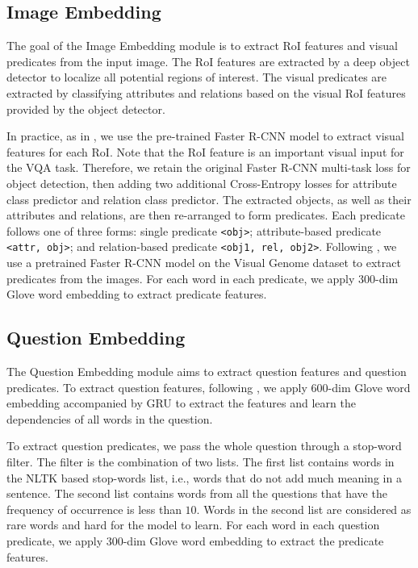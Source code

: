 \documentclass[10pt,twocolumn,letterpaper]{article}
\begin{document}
\subsection{Image Embedding}
\label{subsec_image_embedding}

The goal of the Image Embedding module is to extract RoI features and visual predicates from the input image. The RoI features are extracted by a deep object detector to localize all potential regions of interest. The visual predicates are extracted by classifying attributes and relations based on the visual RoI features provided by the object detector.

In practice, as in \cite{Kim2018BilinearAN, tip-trick}, we use the pre-trained Faster R-CNN model \cite{bottom-up2017} to extract visual features for each RoI. Note that the RoI feature is an important visual input for the VQA task. Therefore, we retain the original Faster R-CNN multi-task loss for object detection, then adding two additional Cross-Entropy losses for attribute class predictor and relation class predictor. The extracted objects, as well as their attributes and relations, are then re-arranged to form predicates. Each predicate follows one of three forms: single predicate \texttt{<obj>}; attribute-based predicate \texttt{<attr, obj>}; and relation-based predicate \texttt{<obj1, rel, obj2>}. Following \cite{Kim2018BilinearAN, tip-trick, li2019regat}, we use a pretrained Faster R-CNN model on the Visual Genome dataset \cite{visualgenome} to extract predicates from the images. For each word in each predicate, we apply 300-dim Glove word embedding \cite{pennington2014glove} to extract predicate features.








\subsection{Question Embedding}

\label{subsec_question_embedding}

The Question Embedding module aims to extract question features and question predicates. To extract question features, following \cite{Kim2018BilinearAN, do2019cti, yu2019mcan}, we apply $600$-dim Glove word embedding \cite{pennington2014glove} accompanied by GRU \cite{2014ChoGRU} to extract the features and learn the dependencies of all words in the question. 

To extract question predicates, we pass the whole question through a stop-word filter. The filter is the combination of two lists. The first list contains words in the NLTK based stop-words \cite{loper2002nltk} list, i.e., words that do not add much meaning in a sentence.  The second list contains words from all the questions that have the frequency of occurrence is less than $10$. Words in the second list are considered as rare words and hard for the model to learn. For each word in each question predicate, we apply 300-dim Glove word embedding \cite{pennington2014glove} to extract the predicate features.
\end{document}
